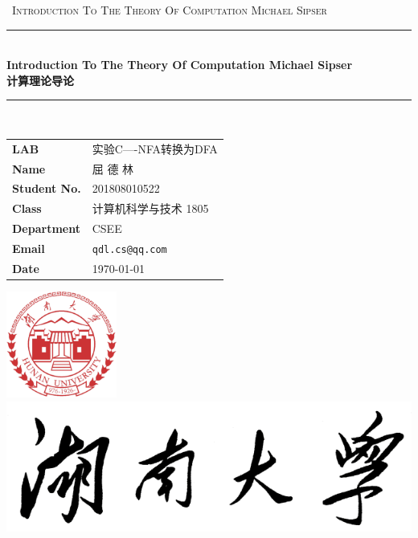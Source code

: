 \documentclass{hnureport}
\begin{document}
\begin{titlepage}
    \clearpage\thispagestyle{empty}
    \centering
    \vspace{1cm}
    {\
        \textsc{Introduction To The Theory Of Computation Michael Sipser}
    }
    \vspace{2.5cm}
    
    \rule{\linewidth}{2mm} \\[0.5cm]
    { \Huge \bfseries Introduction To The Theory Of Computation Michael Sipser\\[0.2em]
        计算理论导论}\\[0.5cm]
    \rule{\linewidth}{0.6mm} \\[1.5cm]
    
    \hspace{2cm}
    \begin{tabular}{l p{5cm}}
        \textbf{LAB} & 实验C----NFA转换为DFA \\[10pt]
        \textbf{Name} & 屈 德 林 \\[10pt]
        \textbf{Student No.} & 201808010522 \\[10pt]
        \textbf{Class} & 计算机科学与技术 1805 \\[10pt]
        \textbf{Department} & CSEE \\[10pt]
        \textbf{Email} & \texttt{qdl.cs@qq.com} \\[10pt]
        \textbf{Date} & \today \\            
    \end{tabular}
    
    \vfill
    \centering \includegraphics[height=3.5cm]{Figure/HNUlogo.pdf}\\ %
    \centering \includegraphics[scale=0.3]{Figure/logo_slogan.png}
    \vspace{0.5cm}

    \pagebreak
\end{titlepage}

\thispagestyle{empty}
\tableofcontents
\newpage 
\setcounter{page}{1}


\newpage

\newpage


\appendix

\end{document}
